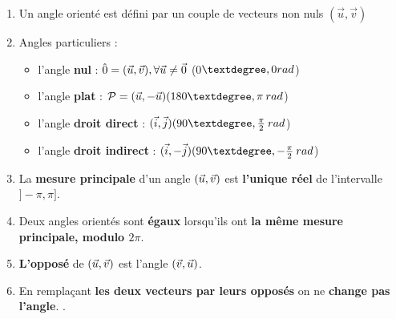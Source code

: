 \begin{enumerate}
	
\item Un angle orienté est défini par un couple de vecteurs non nuls $(\vec{u}, \vec{v})$


\item Angles particuliers :
\begin{itemize}
	\item l'angle \textbf{nul} : $\hat{0} = (\vec{u}, \vec{v}) , \forall \vec{u} \neq \vec{0} $  (0$\textdegree, 0 rad$)
	\item l'angle \textbf{plat} :  $\mathcal{P} = \aopn{u}{u} (180\textdegree, \pi \:rad $)
	\item l'angle \textbf{droit direct} : $\aopp{i}{j} (90\textdegree, \frac{\pi}{2} \: rad$)
	\item l'angle \textbf{droit indirect} : $\aopn{i}{j} (90\textdegree, -\frac{\pi}{2} \: rad$)
\end{itemize}

\item La \textbf{mesure principale} d'un angle $(\vec{u}, \vec{v})$ est \textbf{l'unique réel} de l'intervalle $]-\pi, \pi]$.

\item Deux angles orientés sont \textbf{égaux} lorsqu'ils ont \textbf{la même mesure principale, modulo $2\pi$}.

\item \textbf{L'opposé} de $(\vec{u}, \vec{v})$ est l'angle $(\vec{v}, \vec{u})$. %

\item En remplaçant \textbf{les deux vecteurs par leurs opposés} on ne \textbf{change pas l'angle}. %
.
\end{enumerate}
